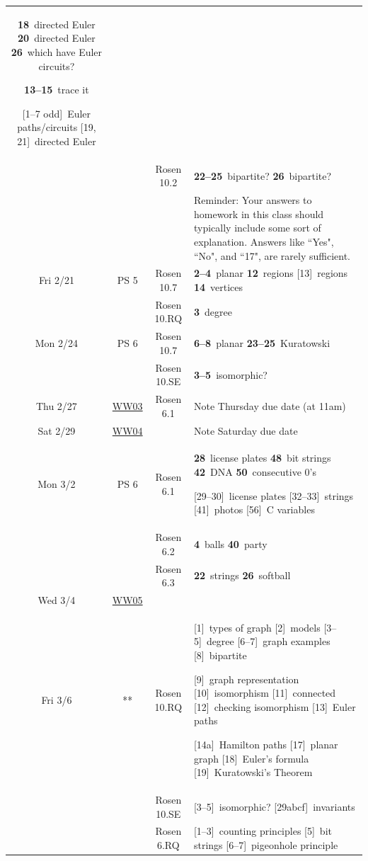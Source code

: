 \documentclass{article}
\def\WW#1{\href{https://mathwebwork.cs.calvin.edu/webwork2/Math252-S20-Pruim/WW#1}{WW#1}}
\def\hwn#1{\relax}
\def\hwn#1{\ {\tiny (#1)}}
\def\hwn#1{$_{\mbox{\ \tiny #1}}$}
\def\hwn#1{~{\tiny #1}}
\newcommand{\extra}[2][\relax]{[#2]\hwn{#1}}
\newcommand{\mand}[2][\relax]{{\bf \large #2}\hwn{#1}}
\begin{document}
\begin{center}
\begin{longtable}{|c|c|c|p{4.3in}|}
	 \mand[directed Euler]{18}
	 \mand[directed Euler]{20}
	 \mand[which have Euler circuits?]{26}

	 \mand[trace it]{13--15}

	 \extra[Euler paths/circuits]{1--7 odd}
	 \extra[directed Euler]{19, 21}
	 \\
	 & & Rosen 10.2 &
	 \mand[bipartite?]{22--25}
	 \mand[bipartite?]{26}
	 \\
	 &&& Reminder: Your answers to homework in this class
	 should typically include some sort of explanation.
	 Answers like ``Yes", ``No", and ``17", are rarely sufficient.
	 \\
	 \hline
	 Fri 2/21 & PS 5 & Rosen 10.7 &
	 \mand[planar]{2--4}
	 \mand[regions]{12}
	 \extra[regions]{13}
	 \mand[vertices]{14}
	 \\
	 & & Rosen 10.RQ &
	 \mand[degree]{3}
	 \\
	 \hline
	 Mon 2/24 & PS 6 & Rosen 10.7 &
	 \mand[planar]{6--8}
	 \mand[Kuratowski]{23--25}
	 \\
	 && Rosen 10.SE &
	 \mand[isomorphic?]{3--5}
	 \\
	 \hline
	 Thu 2/27 & \WW{03} & Rosen 6.1 & Note Thursday due date (at 11am)
	 \\
	 \hline
	 Sat 2/29 & \WW{04} & & Note Saturday due date
	 \\
	 \hline
	 \newpage
	  Mon 3/2 & PS 6 & Rosen 6.1 &
    \mand[license plates]{28}
	  \mand[bit strings]{48}
	  \mand[DNA]{42}
	  \mand[consecutive 0's]{50}  %

   \extra[license plates]{29--30}
   \extra[strings]{32--33}
   \extra[photos]{41}
   \extra[C variables]{56}
  \\
  & & Rosen 6.2 &
    \mand[balls]{4}
    \mand[party]{40}
  \\
  & & Rosen 6.3 &
    \mand[strings]{22}
    \mand[softball]{26}
 \\
 \hline
 Wed 3/4 & \WW{05} & & \\
 \hline
 Fri 3/6 & ** & Rosen 10.RQ &
   \extra[types of graph]{1}
	 \extra[models]{2}
	 \extra[degree]{3--5}
	 \extra[graph examples]{6--7}
	 \extra[bipartite]{8}

	 \extra[graph representation]{9}
	 \extra[isomorphism]{10}
	 \extra[connected]{11}
	 \extra[checking isomorphism]{12}
	 \extra[Euler paths]{13}

	 \extra[Hamilton paths]{14a}
	 \extra[planar graph]{17}
	 \extra[Euler's formula]{18}
	 \extra[Kuratowski's Theorem]{19}
	 \\
	 & & Rosen 10.SE &
	 \extra[isomorphic?]{3--5}
	 \extra[invariants]{29abcf}
 \\
  & & Rosen 6.RQ &
	 \extra[counting principles]{1--3}
	 \extra[bit strings]{5}
	 \extra[pigeonhole principle]{6--7}


\end{longtable}
\end{center}
\end{document}
